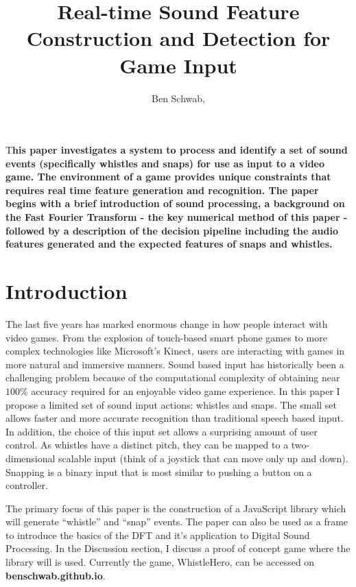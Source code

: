 \documentclass[DIV=calc, paper=a4, fontsize=11pt, twocolumn]{scrartcl}   %
\title{Real-time Sound Feature Construction and Detection for Game Input } %
\author{Ben Schwab, } %
\date{} %
\newcommand{\initial}[1]{ %
\lettrine[lines=3,lhang=0.3,nindent=0em]{
\color{DarkGoldenrod}
{\textsf{#1}}}{}}
\begin{document}
\maketitle %

\thispagestyle{fancy} %



\initial{T}\textbf{his paper investigates a system to process and identify a set of sound events (specifically whistles and snaps) for use as input to a video game. The environment of a game provides unique constraints that requires real time feature generation and recognition. The paper begins with a brief introduction of sound processing, a background on the Fast Fourier Transform - the key numerical method of this paper - followed by a description of the decision pipeline including the audio features generated and the expected features of snaps and whistles.  }

\tableofcontents

\section{Introduction}

\par The last five years has marked enormous change in how people interact with video games. From the explosion of touch-based smart phone games to more complex technologies like Microsoft's Kinect, users are interacting with games in more natural and immersive manners. Sound based input has historically been a challenging problem because of the computational complexity of obtaining near $100\%$ accuracy required for an enjoyable video game experience. In this paper I propose a limited set of sound input actions: whistles and snaps. The small set allows faster and more accurate recognition than traditional speech based input. In addition, the choice of this input set allows a surprising amount of user control. As whistles have a distinct pitch, they can be mapped to a two-dimensional scalable input (think of a joystick that can move only up and down). Snapping is a binary input that is most similar to pushing a button on a controller.
\par The primary focus of this paper is the construction of a JavaScript library which will generate ``whistle'' and ``snap'' events. The paper can also be used as a frame to introduce the basics of the DFT and it's application to Digital Sound Processing. In the Discussion section, I discuss a proof of concept game where the library will is used. Currently the game, WhistleHero, can be accessed on \textbf{benschwab.github.io}.
\end{document}
